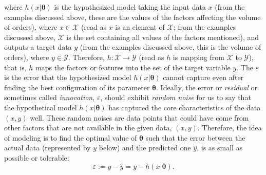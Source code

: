 where $h(x|\boldsymbol{\theta})$ is the hypothesized model taking the input data $x$ (from the examples discussed above, these are the values of the factors affecting the volume of orders), where $x\in\mathscr{X}$ (read as $x$ is an element of $\mathscr{X}$; from the examples discussed above, $\mathscr{X}$ is the set containing all values of the factors mentioned), and outputs a target data $y$ (from the examples discussed above, this is the volume of orders), where $y\in\mathscr{Y}$. Therefore, $h:\mathscr{X}\rightarrow\mathscr{Y}$ (read as $h$ is mapping from $\mathscr{X}$ to $\mathscr{Y}$), that is, $h$ maps the factors or features into the set of the target variable $y$. The $\varepsilon$ is the error that the hypothesized model $h(x|\boldsymbol{\theta})$ cannot capture even after finding the best configuration of its parameter $\boldsymbol{\theta}$. Ideally, the error or \textit{residual} or sometimes called \textit{innovation}, $\varepsilon$, should exhibit \textit{random noise} for us to say that the hypothetical model $h(x|\boldsymbol{\theta})$ has captured the core characteristics of the data $(x,y)$ well. These random noises are data points that could have come from other factors that are not available in the given data, $(x,y)$. Therefore, the idea of modeling is to find the optimal value of $\boldsymbol{\theta}$ such that the error between the actual data (represented by $y$ below) and the predicted one $\hat{y}$, is as small as possible or tolerable:
\begin{equation}
    \varepsilon:=y-\hat{y}=y-h(x|\boldsymbol{\theta}).
\end{equation}

